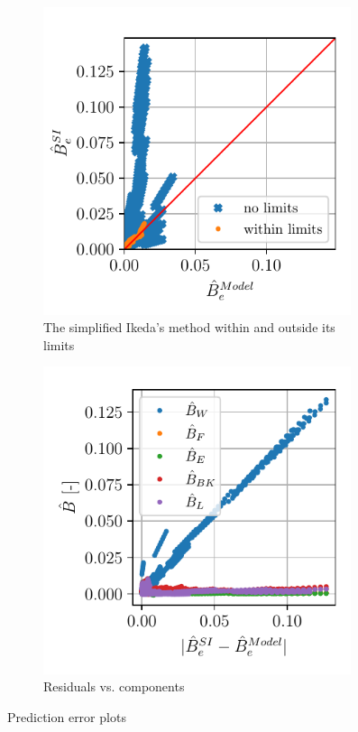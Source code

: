 \begin{figure}[!htb]
\centering
    \begin{subfigure}[b]{0.49\textwidth}
    
        \centering
        \includegraphics[width=0.99\textwidth]{kappa/images/si_model_within.pdf}
        \vspace{-0.5cm}
        \caption{The simplified Ikeda's method within and outside its limits}
        \label{fig:si_model_within}
    \end{subfigure}
    \hfill
    \begin{subfigure}[b]{0.49\textwidth}
        \includegraphics[width=0.99\textwidth]{kappa/images/component_residual.pdf}
        \caption{Residuals vs. components}
        \label{fig:component_residual}
    \end{subfigure}
    \caption{Prediction error plots}
\end{figure}

